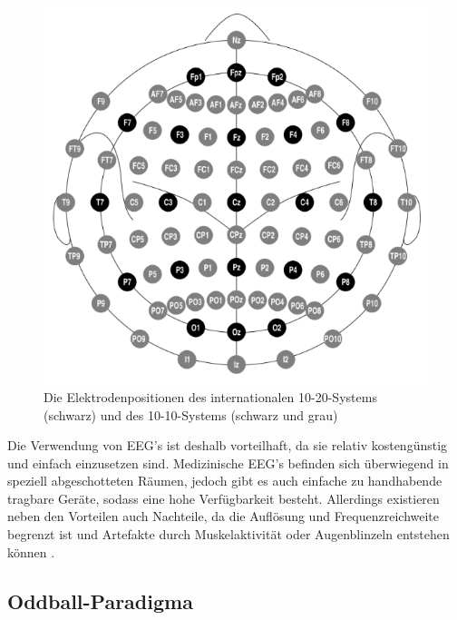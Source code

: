 \begin{figure}[h!]
\begin{center}
\includegraphics[scale=0.61]{images/1010.png}
\caption{Die Elektrodenpositionen des internationalen 10-20-Systems (schwarz) und des 10-10-Systems (schwarz und grau)}
\label{electrodes}
\end{center}
\end{figure}


Die Verwendung von \acs{EEG}'s ist deshalb vorteilhaft, da sie relativ kostengünstig und einfach einzusetzen sind.
Medizinische \acs{EEG}'s befinden sich überwiegend in speziell abgeschotteten Räumen, jedoch gibt es auch einfache zu handhabende tragbare Geräte, sodass eine hohe Verfügbarkeit besteht.
Allerdings existieren neben den Vorteilen auch Nachteile, da die Auflösung und Frequenzreichweite begrenzt ist und Artefakte durch Muskelaktivität oder Augenblinzeln entstehen können \cite{Graimann2010}.









\subsection{Oddball-Paradigma}
\vspace{0.3cm}

